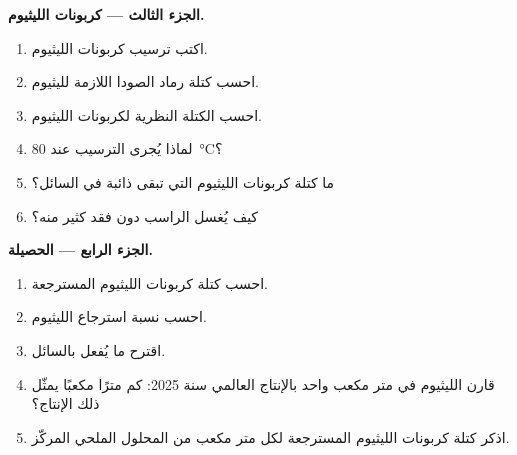 \begin{problem}
\medskip
\noindent\textbf{الجزء الثالث --- كربونات الليثيوم.}
\begin{enumerate}[resume]
  \item اكتب ترسيب كربونات الليثيوم.
  \item احسب كتلة رماد الصودا اللازمة لليثيوم.
  \item احسب الكتلة النظرية لكربونات الليثيوم.
  \item لماذا يُجرى الترسيب عند \qty{80}{\celsius}؟
  \item ما كتلة كربونات الليثيوم التي تبقى ذائبة في السائل؟
  \item كيف يُغسل الراسب دون فقد كثير منه؟
\end{enumerate}

\medskip
\noindent\textbf{الجزء الرابع --- الحصيلة.}
\begin{enumerate}[resume]
  \item احسب كتلة كربونات الليثيوم المسترجعة.
  \item احسب نسبة استرجاع الليثيوم.
  \item اقترح ما يُفعل بالسائل.
  \item قارن الليثيوم في متر مكعب واحد بالإنتاج العالمي
        سنة 2025: كم مترًا مكعبًا يمثّل ذلك الإنتاج؟
  \item اذكر كتلة كربونات الليثيوم المسترجعة لكل متر مكعب من المحلول
        الملحي المركّز.
\end{enumerate}
\end{problem}
